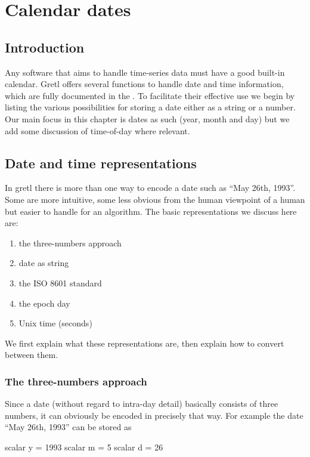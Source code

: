 \chapter{Calendar dates}
\label{chap:calendar}

\section{Introduction}
\label{sec:cal-intro}

Any software that aims to handle time-series data must have a good
built-in calendar. Gretl offers several functions to handle date and
time information, which are fully documented in the \GCR{}. To
facilitate their effective use we begin by listing the various
possibilities for storing a date either as a string or a number.
Our main focus in this chapter is dates as such (year, month and
day) but we add some discussion of time-of-day where relevant.

\section{Date and time representations}
\label{sec:cal-representations}

In gretl there is more than one way to encode a date such as ``May
26th, 1993''. Some are more intuitive, some less obvious from the
human viewpoint of a human but easier to handle for an algorithm. The
basic representations we discuss here are:
\begin{enumerate}
\item the three-numbers approach
\item date as string
\item the ISO 8601 standard
\item the epoch day
\item Unix time (seconds)
\end{enumerate}
We first explain what these representations are, then explain how
to convert between them.

\subsection{The three-numbers approach}
\label{sec:cal-3numbers}

Since a date (without regard to intra-day detail) basically consists
of three numbers, it can obviously be encoded in precisely that way.
For example the date ``May 26th, 1993'' can be stored as
\begin{code}
  scalar y = 1993
  scalar m = 5
  scalar d = 26
\end{code}

